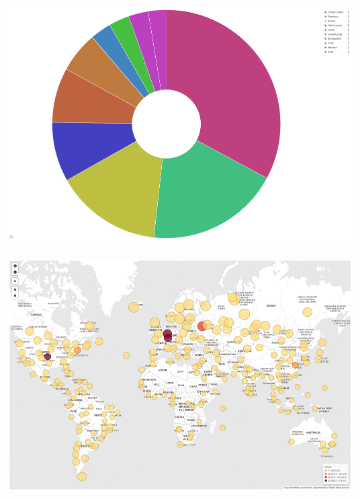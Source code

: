\begin{figure}
    \centering
   
    \begin{subfigure}[b]{0.49\textwidth}
        \centering
        \includegraphics[width=\textwidth]{figures/tpot-attacks-country.png}
        \caption{}
        \label{fig:tpot-overview-map}
    \end{subfigure}
    \hfill
    \begin{subfigure}[b]{0.49\textwidth}
        \centering
        \includegraphics[width=\textwidth]{figures/tpot-overview-map.png}
        \caption{}
        \label{fig:tpot-attack-country}
    \end{subfigure}
    \caption[]{}
    \label{fig:attack}
\end{figure}

